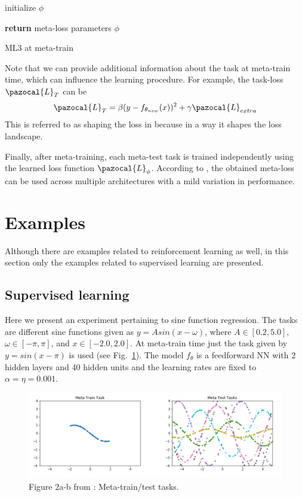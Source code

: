 \begin{algorithm}[H]
	\label{algo:ML3}
	\SetAlgoLined
	initialize $\phi$
	
	\textbf{return} meta-loss parameters $\phi$
	\caption{ML3 at meta-train}
\end{algorithm}
Note that we can provide additional information about the task at meta-train time, which can influence the learning procedure. 
For example, the task-loss $\pazocal{L}_T$ can be
\begin{equation}\label{eq:total_task}
	\pazocal{L}_T = \beta(y - f_{\theta_{new}}(x))^2 + \gamma \pazocal{L}_{extra}
\end{equation}
This is referred to as shaping the loss in \textcite{bechtle2020metalearning} because in a way it shapes the loss landscape.

Finally, after meta-training, each meta-test task is trained independently using the learned loss function $\pazocal{L}_{\phi}$.
According to \textcite{bechtle2020metalearning}, the obtained meta-loss can be used across multiple architectures with a mild variation in performance.

\section{Examples}

Although there are examples related to reinforcement learning as well, in this section only the examples related to supervised learning are presented.

\subsection{Supervised learning}

Here we present an experiment pertaining to sine function regression. 
The tasks are different sine functions given as $y=Asin(x-\omega)$, where $A \in [0.2, 5.0]$, $\omega \in [-\pi, \pi]$, and $x \in [-2.0, 2.0]$.
At meta-train time just the task given by $y=sin(x-\pi)$ is used (see Fig.~\ref{fig:fig2ab}). 
The model $f_{\theta}$ is a feedforward NN with 2 hidden layers and 40 hidden units and the learning rates are fixed to $\alpha = \eta = 0.001$.
\begin{figure}[H]
	\centering
	\includegraphics[width=0.65\linewidth]{./Figures/fig2ab.png}
	\caption{Figure 2a-b from \textcite{bechtle2020metalearning}: Meta-train/test tasks.}
	\label{fig:fig2ab}
\end{figure}

